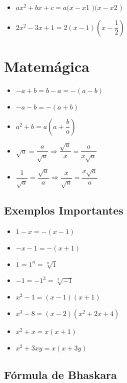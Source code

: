 \documentclass[12pt]{article}
\newcommand{\ts}[1]{\tiny #1 \normalsize }
\begin{document}
\begin{multicols}{2}
\begin{itemize}
\item $ax^2 + bx + c = a(x-x$\ts{1}$)(x-x$\ts{2}$)$
\item $2x^2-3x+1 = 2(x-1)(x-\dfrac{1}{2})$
\end{itemize}
\end{multicols}

\section{Matemágica}

\begin{multicols}{2}
\begin{itemize}
\item $-a+b = b-a = -(a-b)$
\item $-a-b = -(a+b)$
\item $a^2 + b = a(a + \dfrac{b}{a})$
\item $\sqrt{a} = \dfrac{a}{\sqrt{a}} \Rightarrow \dfrac{\sqrt{a}}{x} = \dfrac{a}{x\sqrt{a}}$
\item $\dfrac{1}{\sqrt{a}} = \dfrac{\sqrt{a}}{a} \Rightarrow \dfrac{x}{\sqrt{a}} = \dfrac{x\sqrt{a}}{a}$
\end{itemize}
\end{multicols}

\subsection{Exemplos Importantes}

\begin{multicols}{2}
\begin{itemize}
\item $1-x = -(x-1)$
\item $-x-1 = -(x+1)$
\item $1 = 1^n = \sqrt[n]{1}$
\item $-1 = -1^3 = \sqrt[3]{-1}$
\item $x^2-1 = (x-1)(x+1)$
\item $x^3-8 = (x-2)(x^2+2x+4)$
\item $x^2+x = x(x+1)$
\item $x^2+3xy = x(x+3y)$
\end{itemize}
\end{multicols}

\subsection{Fórmula de Bhaskara}
\end{document}
